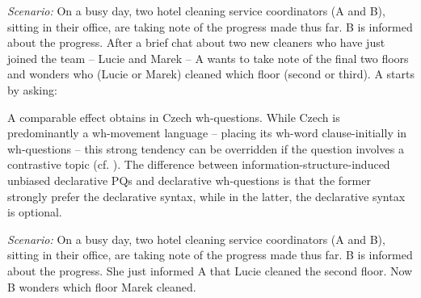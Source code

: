 \documentclass[output=paper,colorlinks,citecolor=brown]{langscibook}
\begin{document}
\eanoraggedright \textit{Scenario:} On a busy day, two hotel cleaning service coordinators (A and B), sitting in their office, are taking note of the progress made thus far. B is informed about the progress. After a brief chat about two new cleaners who have just joined the team -- Lucie and Marek -- A wants to take note of the final two floors and wonders who (Lucie or Marek) cleaned which floor (second or third). A starts by asking:\label{sim:ex:decl-is}
\z\z

\noindent A comparable effect obtains in Czech wh-questions. While Czech is predominantly a wh-movement language -- placing its wh-word clause-initially in wh-questions \citep{Veselovska2021} -- this strong tendency can be overridden if the question involves a contrastive topic (cf. \citealt{Bobaljik.Wurmbrand2015}). The difference between informa\-tion-structure-induced unbiased declarative PQs and declarative wh-questions is that the former strongly prefer the declarative syntax, while in the latter, the declarative syntax is optional.

\eanoraggedright \textit{Scenario:} On a busy day, two hotel cleaning service coordinators (A and B), sitting in their office, are taking note of the progress made thus far. B is informed about the progress. She just informed A that Lucie cleaned the second floor. Now B wonders which floor Marek cleaned.\label{sim:ex:decl-is-wh}
\z\z
\end{document}
